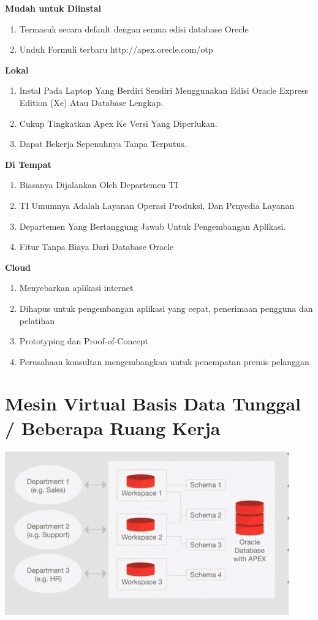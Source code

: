 \documentclass{article}
\begin{document}
\textbf{Mudah untuk Diinstal}
\begin{enumerate}
    \item Termasuk secara default dengan semua edisi database Orecle
    \item Unduh Formuli terbaru http://apex.orecle.com/otp

\end{enumerate}



\textbf{Lokal}
\begin{enumerate}
    \item Instal Pada Laptop Yang Berdiri Sendiri Menggunakan Edisi Oracle Express Edition (Xe) Atau Database Lengkap.
\item Cukup Tingkatkan Apex Ke Versi Yang Diperlukan.
\item Dapat Bekerja Sepenuhnya Tanpa Terputus.
\end{enumerate} 


\textbf{Di Tempat}
\begin{enumerate}
    \item Biasanya Dijalankan Oleh Departemen TI
\item TI Umumnya Adalah Layanan Operasi Produksi, Dan Penyedia Layanan
\item Departemen Yang Bertanggung Jawab Untuk Pengembangan Aplikasi.
\item Fitur Tanpa Biaya Dari Database Oracle
\end{enumerate}


\textbf{Cloud}
\begin{enumerate}
    \item  Menyebarkan aplikasi internet
\item Dihapus untuk pengembangan aplikasi yang cepat, penerimaan pengguna dan pelatihan\\
\item Prototyping dan Proof-of-Concept
\item Perusahaan konsultan mengembangkan untuk penempatan premis pelanggan
\end{enumerate}

\section{Mesin Virtual Basis Data Tunggal / Beberapa Ruang Kerja}

\begin{center}
    \includegraphics[width=10cm\textwidth]{figure/3.jpg}
    
\end{center}
\end{document}
